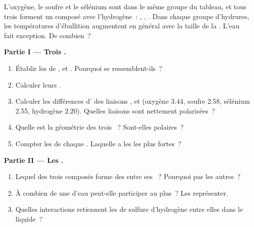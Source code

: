 \begin{problem}
\label{pb:g11:polarity-and-cohesion:1}
L'oxygène, le soufre et le sélénium sont dans le même groupe du tableau,
et tous trois forment un composé avec l'hydrogène~: , ,
. Dans chaque groupe d'hydrures, les températures d'ébullition
augmentent en général avec la taille de la . L'eau fait
exception. De combien~?

\medskip
\noindent\textbf{Partie I --- Trois .}
\begin{enumerate}
  \item Établir les  de ,  et .
        Pourquoi se ressemblent-ils~?
  \item Calculer leurs .
  \item Calculer les différences d' des liaisons
        ,  et  (oxygène 3.44, soufre 2.58,
        sélénium 2.55, hydrogène 2.20). Quelles liaisons sont nettement
        polarisées~?
  \item Quelle est la géométrie des trois ~? Sont-elles
        polaires~?
  \item Compter les  de chaque . Laquelle a les
         les plus fortes~?
\end{enumerate}

\medskip
\noindent\textbf{Partie II --- Les .}
\begin{enumerate}[resume]
  \item Lequel des trois composés forme des  entre ses
        ~? Pourquoi pas les autres~?
  \item À combien de  une  d'eau peut-elle
        participer au plus~? Les représenter.
  \item Quelles interactions retiennent les  de sulfure
        d'hydrogène entre elles dans le liquide~?
\end{enumerate}


\end{problem}
